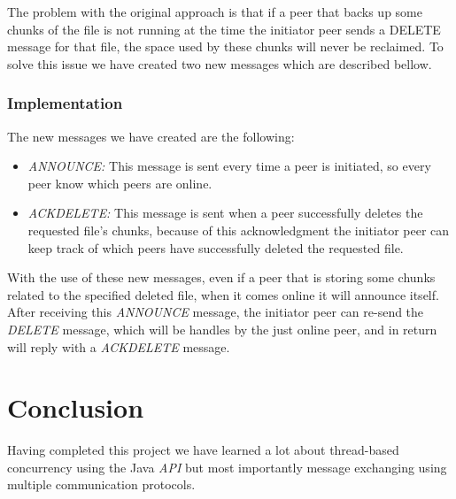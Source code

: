 \documentclass[a4paper]{article}
\begin{document}
            The problem with the original approach is that if a peer that backs up some chunks of the file is not running at the time the initiator peer sends a DELETE message for that file, the space used by these chunks will never be reclaimed. To solve this issue we have created two new messages which are described bellow.
        
        \subsubsection{Implementation}
        
            The new messages we have created are the following:
            
            \begin{itemize}
                \item \textit{ANNOUNCE:} This message is sent every time a peer is initiated, so every peer know which peers are online.
                
                \item \textit{ACKDELETE:} This message is sent when a peer successfully deletes the requested file's chunks, because of this acknowledgment the initiator peer can keep track of which peers have successfully deleted the requested file.
            \end{itemize}
            
            With the use of these new messages, even if a peer that is storing some chunks related to the specified deleted file, when it comes online it will announce itself. After receiving this \textit{ANNOUNCE} message, the initiator peer can re-send the \textit{DELETE} message, which will be handles by the just online peer, and in return will reply with a \textit{ACKDELETE} message.

\section{Conclusion}

    Having completed this project we have learned a lot about thread-based concurrency using the Java \textit{API} but most importantly message exchanging using multiple communication protocols.

\clearpage
\renewcommand\refname{References}


\end{document}
